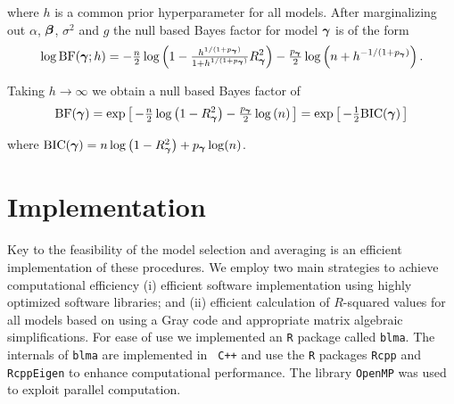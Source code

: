 \noindent where $h$ is a common prior hyperparameter for all models. After
marginalizing out $\alpha$, ${\boldsymbol \beta}$, $\sigma^2$ and $g$ the null based Bayes
factor for model ${\boldsymbol \gamma}$ is of the form
$$
\begin{array}{rl}
\displaystyle \log\mbox{BF}({\boldsymbol \gamma};h)
=
-\tfrac{n}{2}\log\left( 1 - \tfrac{h^{1/(1+p_{\boldsymbol \gamma})}}{1+h^{1/(1+p_{\boldsymbol \gamma})}} R_{\boldsymbol \gamma}^2 \right) 
- \tfrac{p_{\boldsymbol \gamma}}{2}\log\left(n + h^{-1/(1+p_{\boldsymbol \gamma})} \right).
\end{array}
$$

\noindent Taking $h\to\infty$ we obtain a null based Bayes factor of
\begin{equation}\label{eq:marginalLikelihoodCake}
	\displaystyle \mbox{BF}({\boldsymbol \gamma})
	=
	\exp\left[ \,
	-\tfrac{n}{2}\log\left( 1 - R_{\boldsymbol \gamma}^2 \right) 
	- \tfrac{p_{\boldsymbol \gamma}}{2}\log\left(n \right) \,
	\right] = \exp\left[ \, -\tfrac{1}{2}\mbox{BIC}({\boldsymbol \gamma}) \,\right]
\end{equation}

\noindent where $\mbox{BIC}({\boldsymbol \gamma}) = n\log\left( 1 - R_{\boldsymbol \gamma}^2 \right) +
p_{\boldsymbol \gamma} \log(n)$. 



\section{Implementation}
\label{sec:implementation}

\noindent Key to the feasibility of the model selection and averaging is an
efficient implementation of these procedures. We employ two main strategies to
achieve computational efficiency (i) efficient software implementation using
highly optimized software libraries; and (ii) efficient calculation of
$R$-squared values for all models based on using a Gray code and appropriate
matrix algebraic simplifications.  For ease of use we implemented an {\tt R}
package called {\tt blma}.  The internals of {\tt blma} are implemented in {\tt
C++} and use the {\tt R} packages \texttt{Rcpp} and \texttt{RcppEigen} to
enhance computational performance. The library {\tt OpenMP} was used to exploit
parallel computation.

